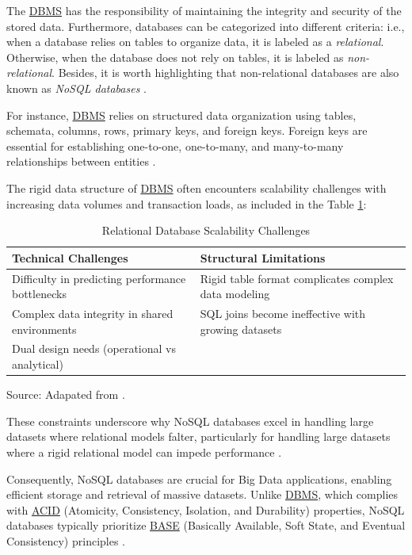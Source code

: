 The \hyperref[appendix:glossary]{DBMS} has the responsibility of maintaining the integrity and security of the stored data. Furthermore, databases can be categorized into different criteria: i.e., when a database relies on tables to organize data, it is labeled as a \textit{relational}. Otherwise, when the database does not rely on tables, it is labeled as \textit{non-relational}. Besides, it is worth highlighting that non-relational databases are also 
known as \textit{NoSQL databases} \cite{birgen2014sql, jatana2012survey}.

For instance, \hyperref[appendix:glossary]{DBMS} relies on structured data organization using tables, schemata, columns, rows, primary keys, and foreign keys. 
Foreign keys are essential for establishing one-to-one, one-to-many, and many-to-many  relationships between entities \cite{bhat2010moving}.

The rigid data structure of \hyperref[appendix:glossary]{DBMS} often encounters scalability challenges with increasing data volumes and transaction loads, as included in the Table \ref{rdbms_challenges}: 

\begin{table}[H]
\centering
\caption{Relational Database Scalability Challenges}
\label{rdbms_challenges}
\begin{tabular}{p{}p{}}
\toprule
\textbf{Technical Challenges} & \textbf{Structural Limitations} \\
\midrule
Difficulty in predicting performance bottlenecks & Rigid table format complicates complex data modeling \\ \hline
Complex data integrity in shared environments & SQL joins become ineffective with growing datasets \\ \hline
Dual design needs (operational vs analytical) & \\
\bottomrule
\end{tabular}
\footnotesize Source: Adapated from \cite{bhat2010moving, jatana2012survey}.
\end{table}

These constraints underscore why NoSQL databases excel in handling large datasets where relational models falter, particularly for 
handling large datasets where a rigid relational model can impede performance \cite{moniruzzaman2013nosqldatabasenewera}.

Consequently, NoSQL databases are crucial for Big Data applications, enabling efficient storage and retrieval of massive datasets. Unlike \hyperref[appendix:glossary]{DBMS}, which complies with \hyperref[appendix:glossary]{ACID} (Atomicity, Consistency, Isolation, and Durability) properties,  NoSQL databases typically prioritize \hyperref[appendix:glossary]{BASE} (Basically Available, Soft State, and Eventual Consistency)  principles \cite{carronosql}.

